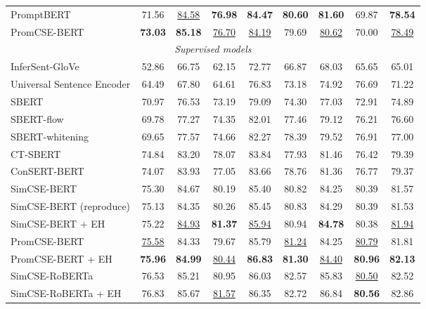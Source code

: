 \documentclass[11pt]{article}
\begin{document}
\begin{table*}[!t]
\begin{tabular}{lcccccccc}
PromptBERT             & 71.56 & \underline{84.58} & \textbf{76.98} & \textbf{84.47} & \textbf{80.60}  & \textbf{81.60}  & 69.87  & \textbf{78.54} \\
 PromCSE-BERT         & \textbf{73.03} & \textbf{85.18} & \underline{76.70}  & \underline{84.19} & 79.69 & \underline{80.62} & 70.00     & \underline{78.49} \\
\midrule
\midrule
\multicolumn{9}{c}{\textit{Supervised models}} \\\midrule
InferSent-GloVe                      & 52.86 & 66.75 & 62.15 & 72.77 & 66.87 & 68.03 & 65.65  & 65.01 \\
Universal Sentence Encoder           & 64.49 & 67.80  & 64.61 & 76.83 & 73.18 & 74.92 & 76.69  & 71.22 \\
SBERT                            & 70.97 & 76.53 & 73.19 & 79.09 & 74.30  & 77.03 & 72.91  & 74.89 \\
SBERT-flow                       & 69.78 & 77.27 & 74.35 & 82.01 & 77.46 & 79.12 & 76.21  & 76.60  \\
SBERT-whitening                  & 69.65 & 77.57 & 74.66 & 82.27 & 78.39 & 79.52 & 76.91  & 77.00    \\
CT-SBERT                         & 74.84 & 83.20  & 78.07 & 83.84 & 77.93 & 81.46 & 76.42  & 79.39 \\
ConSERT-BERT                     & 74.07 & 83.93 & 77.05 & 83.66 & 78.76 & 81.36 & 76.77  & 79.37 \\
SimCSE-BERT                      & 75.30  & 84.67 & 80.19 & 85.40  & 80.82 & 84.25 & 80.39  & 81.57 \\
 SimCSE-BERT (reproduce)        & 75.13 & 84.35 & 80.26 & 85.45 & 80.83 & 84.29 & 80.39  & 81.53 \\
 SimCSE-BERT + EH      & 75.22 & \underline{84.93} & \textbf{81.37} & \underline{85.94} & 80.94 & \textbf{84.78} & 80.38  & \underline{81.94} \\
 PromCSE-BERT                   & \underline{75.58} & 84.33 & 79.67 & 85.79 & \underline{81.24} & 84.25 & \underline{80.79}  & 81.81 \\
 PromCSE-BERT + EH     & \textbf{75.96} & \textbf{84.99} & \underline{80.44} & \textbf{86.83} & \textbf{81.30}  & \underline{84.40}  & \textbf{80.96}  & \textbf{82.13} \\
\midrule
SimCSE-RoBERTa                   & 76.53 & 85.21 & 80.95 & 86.03 & 82.57 & 85.83 & \underline{80.50}   & 82.52 \\
 SimCSE-RoBERTa + EH   & 76.83 & 85.67  & \underline{81.57} & 86.35 & 82.72 & 86.84 & \textbf{80.56}  & 82.86 \\

\end{tabular}
\end{table*}
\end{document}
